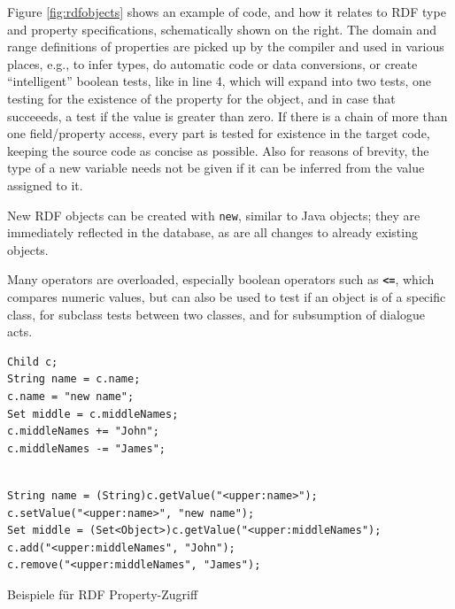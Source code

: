 Figure \ref{fig:rdfobjects} shows an example of \vonda code, and how it relates
to RDF type and property specifications, schematically shown on the right.  The
domain and range definitions of properties are picked up by the compiler and
used in various places, e.g., to infer types, do automatic code or data
conversions, or create ``intelligent'' boolean tests, like in line 4, which
will expand into two tests, one testing for the existence of the property for
the object, and in case that succeeeds, a test if the value is greater than
zero. If there is a chain of more than one field/property access, every part is
tested for existence in the target code, keeping the source code as concise as
possible. Also for reasons of brevity, the type of a new variable needs not be
given if it can be inferred from the value assigned to it.

New RDF objects can be created with \texttt{new}, similar to Java objects; they
are immediately reflected in the database, as are all changes to already
existing objects.

Many operators are overloaded, especially boolean operators such as
\textbf{\texttt{<=}}, which compares numeric values, but can also be used to test if an
object is of a specific class, for subclass tests between two classes, and for
subsumption of dialogue acts.

\begin{table}[htbp]
  \centering
\begin{small}
\begin{minipage}[t]{0.35\textwidth}
\begin{verbatim}
Child c;
String name = c.name;
c.name = "new name";
Set middle = c.middleNames;
c.middleNames += "John";
c.middleNames -= "James";
\end{verbatim}
\end{minipage}
\begin{minipage}[t]{0.6\textwidth}
\begin{verbatim}

String name = (String)c.getValue("<upper:name>");
c.setValue("<upper:name>", "new name");
Set middle = (Set<Object>)c.getValue("<upper:middleNames");
c.add("<upper:middleNames", "John");
c.remove("<upper:middleNames", "James");
\end{verbatim}
\end{minipage}
\end{small}
  \caption{Beispiele für RDF Property-Zugriff}
  \label{tab:property-access}
\end{table}


